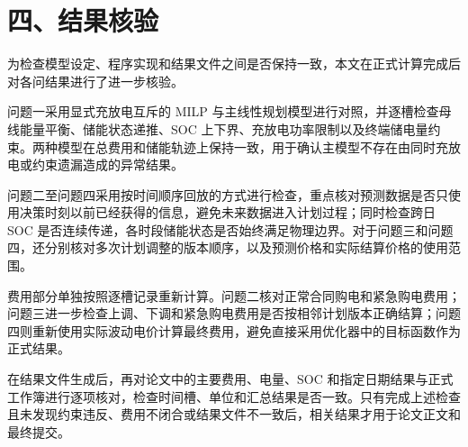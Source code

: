 \documentclass[zihao=-4,a4paper]{ctexart}
\begin{document}
\section*{四、结果核验}

为检查模型设定、程序实现和结果文件之间是否保持一致，本文在正式计算完成后对各问结果进行了进一步核验。

问题一采用显式充放电互斥的 MILP 与主线性规划模型进行对照，并逐槽检查母线能量平衡、储能状态递推、SOC 上下界、充放电功率限制以及终端储电量约束。两种模型在总费用和储能轨迹上保持一致，用于确认主模型不存在由同时充放电或约束遗漏造成的异常结果。

问题二至问题四采用按时间顺序回放的方式进行检查，重点核对预测数据是否只使用决策时刻以前已经获得的信息，避免未来数据进入计划过程；同时检查跨日 SOC 是否连续传递，各时段储能状态是否始终满足物理边界。对于问题三和问题四，还分别核对多次计划调整的版本顺序，以及预测价格和实际结算价格的使用范围。

费用部分单独按照逐槽记录重新计算。问题二核对正常合同购电和紧急购电费用；问题三进一步检查上调、下调和紧急购电费用是否按相邻计划版本正确结算；问题四则重新使用实际波动电价计算最终费用，避免直接采用优化器中的目标函数作为正式结果。

在结果文件生成后，再对论文中的主要费用、电量、SOC 和指定日期结果与正式工作簿进行逐项核对，检查时间槽、单位和汇总结果是否一致。只有完成上述检查且未发现约束违反、费用不闭合或结果文件不一致后，相关结果才用于论文正文和最终提交。
\end{document}
